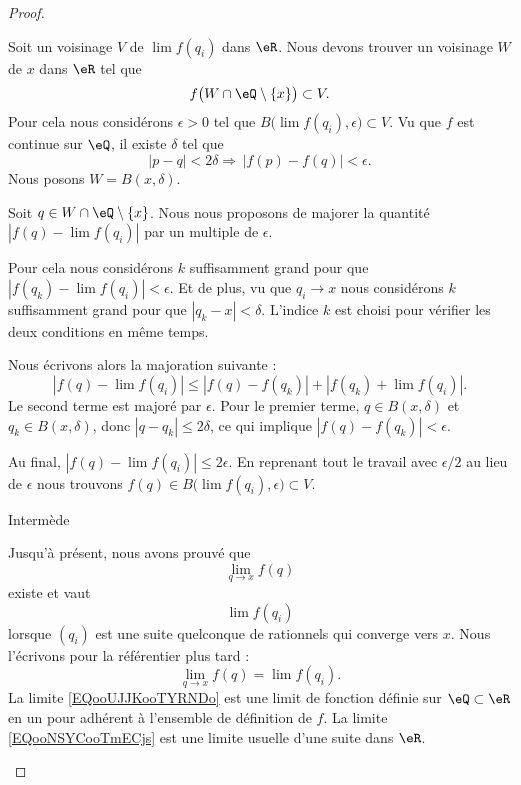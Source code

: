 \begin{proof}
\begin{subproof}
        Soit un voisinage \( V\) de \( \lim f(q_i)\) dans \( \eR\). Nous devons trouver un voisinage \( W\) de \( x\) dans \( \eR\) tel que
        \begin{equation}
            f\big( W\cap\eQ\setminus\{ x \} \big)\subset V.
        \end{equation}
        Pour cela nous considérons \( \epsilon>0\) tel que \( B\big( \lim f(q_i),\epsilon \big)\subset V\). Vu que \( f\) est continue sur \( \eQ\), il existe \( \delta\) tel que
        \begin{equation}
            | p-q |<2\delta\Rightarrow\,| f(p)-f(q) |<\epsilon.
        \end{equation}
        Nous posons \( W=B(x,\delta)\).

        Soit \( q\in W\cap\eQ\setminus\{ x \}\). Nous nous proposons de majorer la quantité $| f(q)-\lim f(q_i) |$ par un multiple de \( \epsilon\).

        Pour cela nous considérons \( k\) suffisamment grand pour que \( | f(q_k)-\lim f(q_i)  |<\epsilon\). Et de plus, vu que \( q_i\to x\) nous considérons \( k\) suffisamment grand pour que \( | q_k-x |<\delta\). L'indice \( k\) est choisi pour vérifier les deux conditions en même temps.

        Nous écrivons alors la majoration suivante :
        \begin{equation}
                | f(q)-\lim f(q_i) |\leq | f(q)-f(q_k) |+| f(q_k)+\lim f(q_i) |.
        \end{equation}
        Le second terme est majoré par \( \epsilon\). Pour le premier terme, \( q\in B(x,\delta)\) et \( q_k\in B(x,\delta)\), donc \( | q-q_k |\leq 2\delta\), ce qui implique \( | f(q)-f(q_k) |<\epsilon\).

        Au final, \( | f(q)-\lim f(q_i) |\leq 2\epsilon\). En reprenant tout le travail avec \( \epsilon/2\) au lieu de \( \epsilon\) nous trouvons \( f(q)\in B\big( \lim f(q_i),\epsilon \big)\subset V\).

    \item[Intermède]

        Jusqu'à présent, nous avons prouvé que
        \begin{equation}        \label{EQooUJJKooTYRNDo}
            \lim_{q\to x} f(q)
        \end{equation}
        existe et vaut
        \begin{equation}        \label{EQooNSYCooTmECjs}
            \lim f(q_i)
        \end{equation}
        lorsque \( (q_{i})\) est une suite quelconque de rationnels qui converge vers \( x\). Nous l'écrivons pour la référentier plus tard :
        \begin{equation}        \label{EQooSGCMooKtpVMy}
            \lim_{q\to x} f(q)=\lim f(q_i).
        \end{equation}
        La limite \eqref{EQooUJJKooTYRNDo} est une limit de fonction définie sur \( \eQ\subset \eR\) en un pour adhérent à l'ensemble de définition de \( f\). La limite \eqref{EQooNSYCooTmECjs} est une limite usuelle d'une suite dans \( \eR\).


\end{subproof}
\end{proof}
